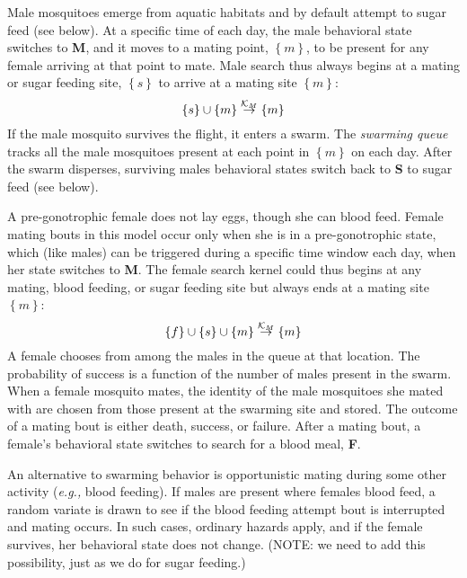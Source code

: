 \documentclass{article}
\newcommand{\eg}{{\em e.g., }}
\begin{document}
Male mosquitoes emerge from aquatic habitats and by default
attempt to sugar feed (see below). At a specific time of each
day, the male behavioral state switches to {\bf M}, and it moves
to a mating point, $\left\{ m \right\}$, to be present for any
female arriving at that point to mate.
Male search thus always begins at a mating or sugar feeding site,
$\left\{ s \right\} $ to arrive at a mating site $\left\{ m
\right\}$:
%
\begin{equation}
%
\left\{ s\right\} \cup \left\{ m\right\}  \overset{{\cal
K}_M}{\rightarrow} \left\{ m\right\}
%
\end{equation}
%
If the male mosquito survives the flight, it enters a swarm. The
{\em swarming queue} tracks all the male mosquitoes present at
each point in $\left\{ m\right\} $ on each day. After the swarm
disperses, surviving males behavioral states switch back to {\bf
S} to sugar feed (see below).

A pre-gonotrophic female does not lay eggs, though she can blood
feed. Female mating bouts in this model occur only when she is in
a pre-gonotrophic state, which (like males) can be triggered
during a specific time window each day, when her state switches
to {\bf M}. The female search kernel could thus begins at any
mating, blood feeding, or sugar feeding site but always ends at a
mating site $\left\{ m\right\} $:
%
\begin{equation}
%
\left\{ f\right\} \cup \left\{ s\right\} \cup \left\{ m\right\}
\overset{{\cal K}_M}{\rightarrow} \left\{ m\right\}
%
\end{equation}
%
A female chooses from among the males in the queue at that
location. The probability of success is a function of the number
of males present in the swarm. When a female mosquito mates, the
identity of the male mosquitoes she mated with are chosen from
those present at the swarming site and stored. The outcome of a
mating bout is either death, success, or failure. After a mating
bout, a female's behavioral state switches to search for a blood
meal, {\bf F}.

An alternative to swarming behavior is opportunistic mating
during some other activity (\eg blood feeding). If males are
present where females blood feed, a random variate is drawn to
see if the blood feeding attempt bout is interrupted and mating
occurs. In such cases, ordinary hazards apply, and if the female
survives, her behavioral state does not change. (NOTE: we need to
add this possibility, just as we do for sugar feeding.)
\end{document}
